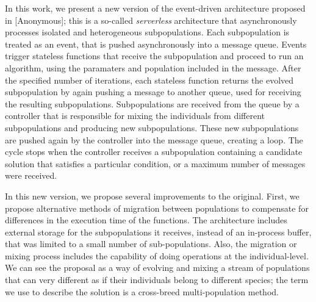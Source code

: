 \documentclass[runningheads]{llncs}
\begin{document}
In this work, we present a new version of the event-driven architecture proposed
in [Anonymous]; this is a so-called {\em serverless} architecture that
asynchronously processes isolated and heterogeneous subpopulations. Each
subpopulation is treated as an event, that is pushed asynchronously into a
message queue. Events trigger stateless functions that receive the subpopulation
and proceed to run an algorithm, using the paramaters and population included in
the message. After the specified number of iterations, each stateless function
returns the evolved subpopulation by again pushing a message to another queue,
used for receiving the resulting subpopulations. Subpopulations are received
from the queue by a controller that is responsible for mixing the individuals
from different subpopulations and producing new subpopulations. These new
subpopulations are pushed again by the controller into the message queue,
creating a loop. The cycle stops when the controller receives a subpopulation
containing a candidate solution that satisfies a particular condition, or a
maximum number of messages were received. 

In this new version, we propose several improvements to the original. First, we
propose alternative methods of migration between populations to compensate for
differences in the execution time of the functions. The architecture includes
external storage for the subpopulations it receives, instead of an in-process
buffer, that was limited to a small number of sub-populations. Also, the
migration or mixing process includes the capability of doing operations at the
individual-level. 
We can see the proposal as a way of evolving and mixing a
stream of populations that can very different as if their individuals belong to
different species; the term we use to describe the solution is a cross-breed
multi-population method.

\end{document}
